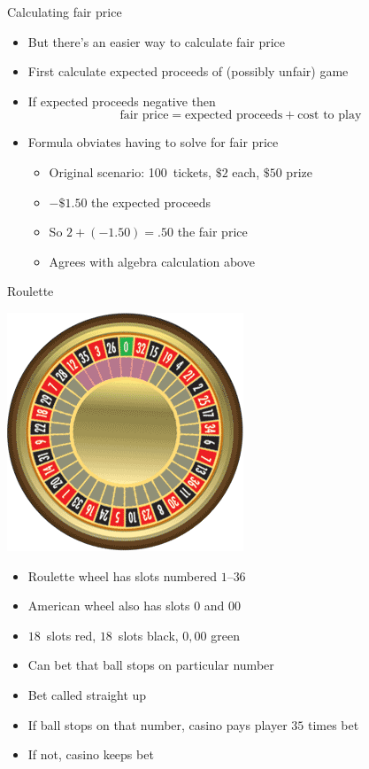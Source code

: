 \documentclass[handout]{beamer}
\theoremstyle{definition}
\begin{document}
\begin{frame}{Calculating fair price}
\begin{itemize}
\item But there's an easier way to calculate fair price
\item First calculate expected proceeds of (possibly unfair) game
\item If expected proceeds \alert{negative} then
\[\text{fair price}=\text{expected proceeds}+\text{cost to play}\]
\item Formula obviates having to solve for fair price
\begin{example}
\begin{itemize}
\item Original scenario: 100~tickets, $\$2$ each, $\$50$ prize
\item $-\$1.50$ the expected proceeds
\item So $2+\left(-1.50\right)=.50$ the fair price
\item Agrees with algebra calculation above
\end{itemize}
\end{example}
\end{itemize}
\end{frame}

\begin{frame}{Roulette}
\begin{multicols}{2}
\includegraphics[scale=.38]{Roulette}
\begin{itemize}
\item Roulette wheel has slots numbered $1$--$36$
\columnbreak
\item American wheel also has slots $0$ and $00$
\item $18$~slots red, $18$~slots black, $0,00$ green
\item Can bet that ball stops on particular number
\item Bet called \alert{straight up}
\item If ball stops on that number, casino pays player
$35$ times bet
\item If not, casino keeps bet
\end{itemize}
\end{multicols}
\end{frame}
\end{document}
